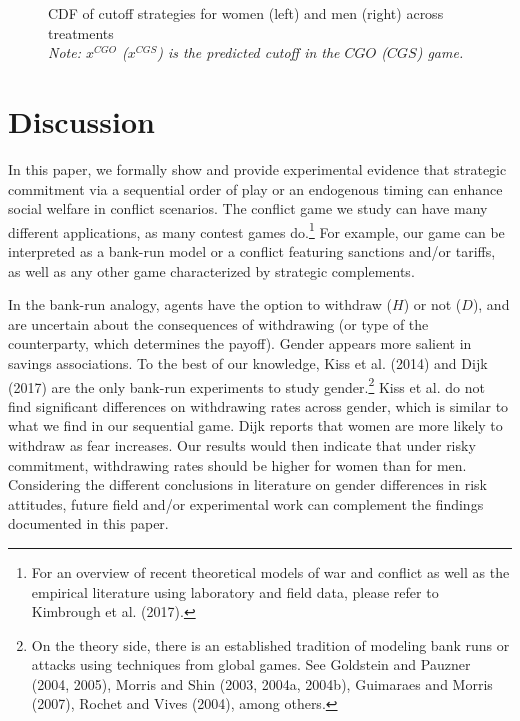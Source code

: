 \documentclass[11pt, letterpaper]{article}
\theoremstyle{plain}
\begin{document}
\begin{center}
\begin{figure}[ht]
\begin{minipage}[t]{0.45\columnwidth}
\end{minipage} 
\caption{CDF of cutoff strategies for women (left) and men (right) across treatments\\\footnotesize{\textit{Note: $x^{CGO}$ ($x^{CGS}$) is the predicted cutoff in the $CGO$ ($CGS$) game.}}}
\label{fig:cdfall}\end{figure}
\par\end{center}

\newpage
\section{Discussion}
\label{sec:discuss}

In this paper, we formally show and provide experimental evidence that strategic commitment via a sequential order of play or an endogenous timing can enhance social welfare in conflict scenarios. The conflict game we study can have many different applications, as many contest games do.\footnote{For an overview of recent theoretical models of war and conflict as well as the empirical literature using laboratory and field data, please refer to Kimbrough et al. (2017).}  For example, our game can be interpreted as a bank-run model or a conflict featuring sanctions and/or tariffs, as well as any other game characterized by strategic complements.

In the bank-run analogy, agents have the option to withdraw ($H$) or not ($D$), and are uncertain about the consequences of withdrawing (or type of the counterparty, which determines the payoff). Gender appears more salient in savings associations. To the best of our knowledge, Kiss et al. (2014) and Dijk (2017) are the only bank-run experiments to study gender.\footnote{On the theory side, there is an established tradition of modeling bank runs or attacks using techniques from global games. See Goldstein and Pauzner (2004, 2005), Morris and Shin (2003, 2004a, 2004b), Guimaraes and Morris (2007), Rochet and Vives (2004), among others.} Kiss et al. do not find significant differences on withdrawing rates across gender, which is similar to what we find in our sequential game.  Dijk reports that women are more likely to withdraw as fear increases. Our results would then indicate that under risky commitment, withdrawing rates should be higher for women than for men. Considering the different conclusions in literature on gender differences in risk attitudes, future field and/or experimental work can complement the findings documented in this paper.
\end{document}
